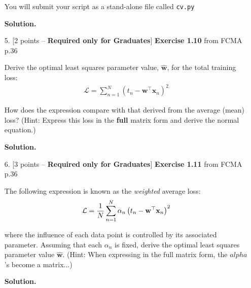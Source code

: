 \documentclass[10pt]{article}
\begin{document}
\begin{itemize}
You will submit your script as a stand-alone file called {\tt cv.py}

{\bf Solution.} 




\item[5.] [2 points -- {\bf Required only for Graduates}] 
{\bf Exercise 1.10} from FCMA p.36

Derive the optimal least squares parameter value, $\mathbf{\hat{w}}$, for the total training loss:
\begin{eqnarray*}
\mathcal{L} = \sum_{n=1}^N \left( t_n - \mathbf{w}^\top \mathbf{x}_n \right)^2
\end{eqnarray*}

How does the expression compare with that derived from the average (mean) loss?  (Hint: Express this loss in the {\bf full} matrix form and derive the normal equation.)

{\bf Solution.} 




\item[6.] [3 points -- {\bf Required only for Graduates}]
{\bf Exercise 1.11} from FCMA p.36

The following expression is known as the {\em weighted} average loss:
\begin{eqnarray*}
\mathcal{L} = {1 \over N} \sum_{n=1}^N \alpha_n \left( t_n - \mathbf{w}^\top \mathbf{x}_n \right)^2
\end{eqnarray*}

where the influence of each data point is controlled by its associated parameter.  Assuming that each $\alpha_n$ is fixed, derive the optimal least squares parameter value $\mathbf{\hat{w}}$.  (Hint: When expressing in the full matrix form, the $alpha$'s become a matrix...)

{\bf Solution.} 



\end{itemize}
\end{document}

